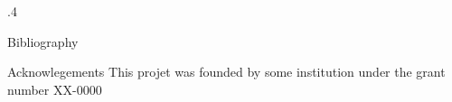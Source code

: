 \documentclass[final]{beamer}
\begin{document}
\begin{frame} [fragile]{}
\begin{columns}
\begin{column}{.4\textwidth}
\begin{exampleblock}{Bibliography}
\vspace{1cm}		
		
		\end{exampleblock}
		
		\begin{exampleblock}{Acknowlegements}
			This projet was founded by some institution under the grant number XX-0000
		
		\end{exampleblock}

	\end{column}
\end{columns}




    
\end{frame}
\end{document}
